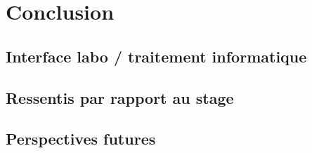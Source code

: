 \chapter{Conclusion}
    \section{Interface labo / traitement informatique}
    \section{Ressentis par rapport au stage}
    \section{Perspectives futures}
    

